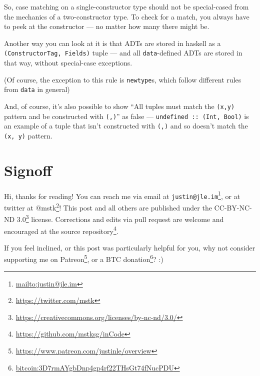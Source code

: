 \documentclass[]{article}
\renewcommand{\href}[2]{#2\footnote{\url{#1}}}
\begin{document}
So, case matching on a single-constructor type should not be special-cased from
the mechanics of a two-constructor type. To check for a match, you always have
to peek at the constructor --- no matter how many there might be.

Another way you can look at it is that ADTs are stored in haskell as a
\texttt{(ConstructorTag,\ Fields)} tuple --- and all \texttt{data}-defined ADTs
are stored in that way, without special-case exceptions.

(Of course, the exception to this rule is \texttt{newtype}s, which follow
different rules from \texttt{data} in general)

And, of course, it's also possible to show ``All tuples must match the
\texttt{(x,y)} pattern and be constructed with \texttt{(,)}'' as false ---
\texttt{undefined\ ::\ (Int,\ Bool)} is an example of a tuple that isn't
constructed with \texttt{(,)} and so doesn't match the \texttt{(x,\ y)} pattern.

\hypertarget{signoff}{%
\section{Signoff}\label{signoff}}

Hi, thanks for reading! You can reach me via email at
\href{mailto:justin@jle.im}{\nolinkurl{justin@jle.im}}, or at twitter at
\href{https://twitter.com/mstk}{@mstk}! This post and all others are published
under the \href{https://creativecommons.org/licenses/by-nc-nd/3.0/}{CC-BY-NC-ND
3.0} license. Corrections and edits via pull request are welcome and encouraged
at \href{https://github.com/mstksg/inCode}{the source repository}.

If you feel inclined, or this post was particularly helpful for you, why not
consider \href{https://www.patreon.com/justinle/overview}{supporting me on
Patreon}, or a \href{bitcoin:3D7rmAYgbDnp4gp4rf22THsGt74fNucPDU}{BTC donation}?
:)
\end{document}
